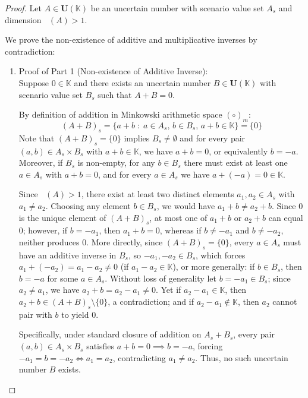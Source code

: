 \documentclass[a4paper,12pt,twoside]{memoir}
\DeclareMathOperator{\dimU}{\dim_U}
\newcommand{\tsbd}[1]{\mathbf{U}(\mathbb{#1})}
\begin{document}
	\begin{proof}
		Let $A \in \tsbd{K}$ be an uncertain number with scenario value set $A_s$ and dimension $\dimU(A) > 1$.
		
		We prove the non-existence of additive and multiplicative inverses by contradiction:
		
		\begin{enumerate}[leftmargin=*]
			\item Proof of Part 1 (Non-existence of Additive Inverse): \\
			Suppose $0 \in \mathbb{K}$ and there exists an uncertain number $B \in \tsbd{K}$ with scenario value set $B_s$ such that $A + B = 0$.
			
			By definition of addition in Minkowski arithmetic space $(\circ)_m$:
			\[
			(A + B)_s = \{a + b \;:\; a \in A_s, \, b \in B_s, \, a + b \in \mathbb{K}\} = \{0\}
			\]
			Note that $(A + B)_s = \{0\}$ implies $B_s \neq \emptyset$ and for every pair $(a, b) \in A_s \times B_s$ with $a + b \in \mathbb{K}$, we have $a + b = 0$, or equivalently $b = -a$. Moreover, if $B_s$ is non-empty, for any $b \in B_s$ there must exist at least one $a \in A_s$ with $a + b = 0$, and for every $a \in A_s$ we have $a + (-a) = 0 \in \mathbb{K}$.
			
			Since $\dimU(A) > 1$, there exist at least two distinct elements $a_1, a_2 \in A_s$ with $a_1 \neq a_2$.
			Choosing any element $b \in B_s$, we would have $a_1 + b \neq a_2 + b$. Since $0$ is the unique element of $(A + B)_s$, at most one of $a_1 + b$ or $a_2 + b$ can equal $0$; however, if $b = -a_1$, then $a_1 + b = 0$, whereas if $b \neq -a_1$ and $b \neq -a_2$, neither produces $0$. More directly, since $(A + B)_s = \{0\}$, every $a \in A_s$ must have an additive inverse in $B_s$, so $-a_1, -a_2 \in B_s$, which forces $a_1 + (-a_2) = a_1 - a_2 \neq 0$ (if $a_1 - a_2 \in \mathbb{K}$), or more generally: if $b \in B_s$, then $b = -a$ for some $a \in A_s$. Without loss of generality let $b = -a_1 \in B_s$; since $a_2 \neq a_1$, we have $a_2 + b = a_2 - a_1 \neq 0$. Yet if $a_2 - a_1 \in \mathbb{K}$, then $a_2 + b \in (A + B)_s \setminus \{0\}$, a contradiction; and if $a_2 - a_1 \notin \mathbb{K}$, then $a_2$ cannot pair with $b$ to yield $0$.
			
			Specifically, under standard closure of addition on $A_s + B_s$, every pair $(a, b) \in A_s \times B_s$ satisfies $a + b = 0 \implies b = -a$, forcing $-a_1 = b = -a_2 \iff a_1 = a_2$, contradicting $a_1 \neq a_2$. Thus, no such uncertain number $B$ exists.
			

\end{enumerate}
\end{proof}
\end{document}
